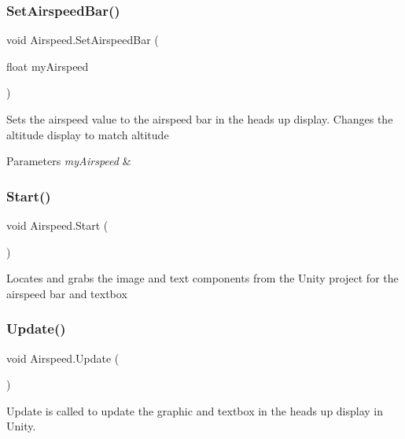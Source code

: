 \subsubsection{\texorpdfstring{Set\+Airspeed\+Bar()}{SetAirspeedBar()}}
{\footnotesize\ttfamily void Airspeed.\+Set\+Airspeed\+Bar (\begin{DoxyParamCaption}\item[{float}]{my\+Airspeed }\end{DoxyParamCaption})}



Sets the airspeed value to the airspeed bar in the heads up display. Changes the altitude display to match altitude 


\begin{DoxyParams}{Parameters}
{\em my\+Airspeed} & \\
\hline
\end{DoxyParams}
\mbox{\label{class_airspeed_ab6fa5e94d6a823bd114762492703db7a}} 
\subsubsection{\texorpdfstring{Start()}{Start()}}
{\footnotesize\ttfamily void Airspeed.\+Start (\begin{DoxyParamCaption}{ }\end{DoxyParamCaption})}



Locates and grabs the image and text components from the Unity project for the airspeed bar and textbox 

\mbox{\label{class_airspeed_a8c1545c6073d8fb71f1280991b41f805}} 
\subsubsection{\texorpdfstring{Update()}{Update()}}
{\footnotesize\ttfamily void Airspeed.\+Update (\begin{DoxyParamCaption}{ }\end{DoxyParamCaption})}



Update is called to update the graphic and textbox in the heads up display in Unity. 



